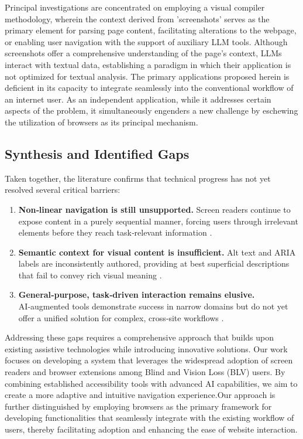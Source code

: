 \documentclass[conference]{IEEEtran}
\begin{document}
Principal investigations are concentrated on employing a visual compiler methodology, wherein the context derived from 'screenshots' serves as the primary element for parsing page content, facilitating alterations to the webpage, or enabling user navigation with the support of auxiliary LLM tools. Although screenshots offer a comprehensive understanding of the page's context, LLMs interact with textual data, establishing a paradigm in which their application is not optimized for textual analysis. The primary applications proposed herein is deficient in its capacity to integrate seamlessly into the conventional workflow of an internet user. As an independent application, while it addresses certain aspects of the problem, it simultaneously engenders a new challenge by eschewing the utilization of browsers as its principal mechanism. \cite{he2024webvoyager, mehendale2024, prakash2024}

\subsection*{Synthesis and Identified Gaps}

Taken together, the literature confirms that technical progress has not yet resolved several critical barriers:

\begin{enumerate}
\item \textbf{Non‑linear navigation is still unsupported.} Screen readers continue to expose content in a purely sequential manner, forcing users through irrelevant elements before they reach task‑relevant information \cite{Babu_2013}.  
\item \textbf{Semantic context for visual content is insufficient.} Alt text and ARIA labels are inconsistently authored, providing at best superficial descriptions that fail to convey rich visual meaning \cite{Chintalapati_2022}.  
\item \textbf{General‑purpose, task‑driven interaction remains elusive.} AI‑augmented tools demonstrate success in narrow domains but do not yet offer a unified solution for complex, cross‑site workflows \cite{prakash2024,kodandaram2024,mehendale2024}.  
\end{enumerate}

Addressing these gaps requires a comprehensive approach that builds upon existing assistive technologies while introducing innovative solutions. Our work focuses on developing a system that leverages the widespread adoption of screen readers and browser extensions among Blind and Vision Loss (BLV) users. By combining established accessibility tools with advanced AI capabilities, we aim to create a more adaptive and intuitive navigation experience.Our approach is further distinguished by employing browsers as the primary framework for developing functionalities that seamlessly integrate with the existing workflow of users, thereby facilitating adoption and enhancing the ease of website interaction. 
\end{document}
